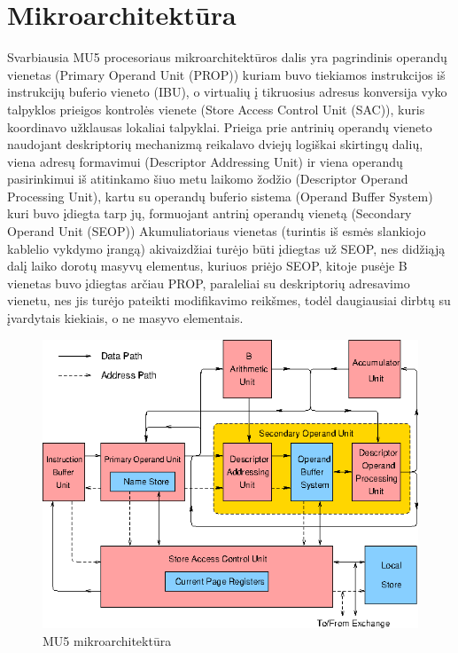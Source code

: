 \documentclass[a4paper,lithuanian]{article}
\begin{document}
\newpage

\section {Mikroarchitektūra}

Svarbiausia MU5 procesoriaus mikroarchitektūros dalis yra pagrindinis operandų vienetas (Primary Operand Unit (PROP)) kuriam buvo tiekiamos instrukcijos iš instrukcijų buferio vieneto (IBU), o virtualių į tikruosius adresus konversija vyko talpyklos prieigos kontrolės vienete (Store Access Control Unit (SAC)), kuris koordinavo užklausas lokaliai talpyklai. Prieiga prie antrinių operandų vieneto naudojant deskriptorių mechanizmą reikalavo dviejų logiškai skirtingų dalių, viena adresų formavimui (Descriptor Addressing Unit) ir viena operandų pasirinkimui iš atitinkamo šiuo metu laikomo žodžio (Descriptor Operand Processing Unit), kartu su operandų buferio sistema (Operand Buffer System) kuri buvo įdiegta tarp jų, formuojant antrinį operandų vienetą (Secondary Operand Unit (SEOP)) Akumuliatoriaus vienetas (turintis iš esmės slankiojo kablelio vykdymo įrangą) akivaizdžiai turėjo būti įdiegtas už SEOP, nes didžiąją dalį laiko dorotų masyvų elementus, kuriuos priėjo SEOP, kitoje pusėje B vienetas buvo įdiegtas arčiau PROP, paraleliai su deskriptorių adresavimo vienetu, nes jis turėjo pateikti modifikavimo reikšmes, todėl daugiausiai dirbtų su įvardytais kiekiais, o ne masyvo elementais.

\begin{figure}[h]
	\includegraphics[scale=0.4]{mu5-march}
	\centering
	\caption{MU5 mikroarchitektūra}
	\label{}
\end{figure}
\end{document}
